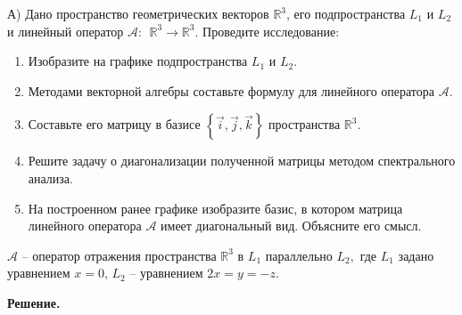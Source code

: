 А) Дано пространство геометрических векторов  $\mathbb{R}^3$, его подпространства  $L_1$  и  $L_2$  и линейный оператор  $\mathcal{A}:\ \ \mathbb{R}^3\rightarrow\mathbb{R}^3$.
Проведите исследование:
\begin{enumerate}
	\item Изобразите на графике подпространства  $L_1$  и  $L_2$.
	\item Методами векторной алгебры составьте формулу для линейного оператора  $\mathcal{A}$.
	\item Составьте его матрицу в базисе $\left\{\vec{i},\vec{j},\vec{k}\right\}$ пространства $\mathbb{R}^3$.
	\item Решите задачу о диагонализации полученной матрицы методом спектрального анализа.
	\item На построенном ранее графике изобразите базис, в котором матрица линейного оператора $\mathcal{A}$ имеет диагональный вид. Объясните его смысл.
\end{enumerate}

$\mathcal{A}$ – оператор отражения пространства  $\mathbb{R}^3$ в $L_1$ параллельно $L_2,$ где $L_1$ задано уравнением $x=0$, $L_2$ – уравнением  $2x=y=-z$.

\vspace{10mm}

\textbf{Решение.}

